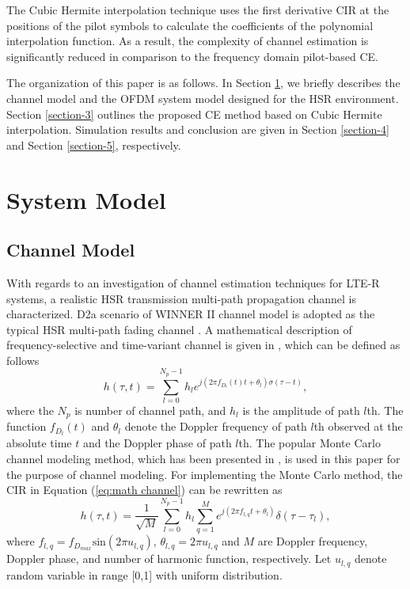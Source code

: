 \documentclass[AMA]{WileyNJD-v1}
\begin{document}
The Cubic Hermite interpolation technique  uses the first derivative CIR at  the positions of the pilot symbols to calculate the coefficients of the polynomial interpolation function. As a result, the complexity of channel estimation is significantly reduced in comparison to the frequency domain pilot-based CE. 

	
The organization of this paper is as follows. In Section \ref{section-2}, we briefly describes the channel model and the OFDM system model designed for the HSR environment. Section \ref{section-3} outlines the proposed CE method based on Cubic Hermite interpolation. Simulation results and conclusion are given in Section \ref{section-4} and Section \ref{section-5}, respectively.
	
	
\section{System Model}\label{section-2}
	
\subsection{Channel Model}\label{section-2.1}

With regards to an investigation of channel estimation techniques for LTE-R systems, a realistic HSR transmission multi-path propagation channel is characterized. D2a scenario of WINNER II channel model is adopted as the typical HSR multi-path fading channel \cite{Guan2011}. A mathematical description of frequency-selective and time-variant channel is given in \cite{Matz2011}, which can be defined as follows
%
\begin{equation}\label{eq:math channel}
	h(\tau,t)=\sum_{l=0}^{N_p-1}h_l e^{j(2\pi f_{D_l}(t)t+\theta_{l})\sigma (\tau-t)},
\end{equation}
%
where the $N_{p}$ is number of channel path, and $h_{l}$ is the amplitude of path $l$th. The function $f_{D_l}(t)$ and $\theta_{l}$ denote the Doppler frequency of path $l$th observed at the absolute time $t$ and the Doppler phase of path $l$th. The popular Monte Carlo channel modeling method, which has been presented in \cite{Nguyen2004}, is used in this paper for the purpose of channel modeling. For implementing the Monte Carlo method, the CIR in Equation (\ref{eq:math channel}) can be rewritten as
%
\begin{equation}\label{eq-math Monte channel}
	h(\tau,t)=\frac{1}{\sqrt{M}}\sum_{l=0}^{N_p-1}h_{l}\sum_{q=1}^{M}e^{j(2\pi f_{l,q}t+\theta_{l})}\delta(\tau-\tau_{l}),
\end{equation}
%
where $f_{l,q} = f_{D_{max}} \text{sin}(2\pi u_{l,q})$, $\theta_{l,q} = 2\pi u_{l,q}$ and $M$ are Doppler frequency, Doppler phase, and number of harmonic function, respectively. Let $u_{l,q}$ denote random variable in range [0,1] with uniform distribution. 
	
\end{document}
